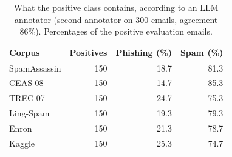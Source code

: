 \begin{table}[t]
\caption{What the positive class contains, according to an LLM annotator (second annotator on 300 emails, agreement 86\%). Percentages of the positive evaluation emails.}
\label{tab:labels}
\centering\footnotesize
\setlength{\tabcolsep}{3pt}
\begin{tabular}{lrrr}
\toprule
Corpus & Positives & Phishing (\%) & Spam (\%) \\
\midrule
SpamAssassin & 150 & 18.7 & 81.3 \\
CEAS-08 & 150 & 14.7 & 85.3 \\
TREC-07 & 150 & 24.7 & 75.3 \\
Ling-Spam & 150 & 19.3 & 79.3 \\
Enron & 150 & 21.3 & 78.7 \\
Kaggle & 150 & 25.3 & 74.7 \\
\bottomrule
\end{tabular}
\end{table}
